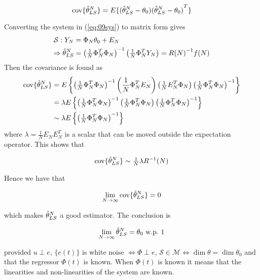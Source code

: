 \begin{equation*}
\text{cov}\{\hat{\theta}_{LS}^N\} = E\{(\hat{\theta}_{LS}^N-\theta_0){(\hat{\theta}_{LS}^N-\theta_0)}^T\}
\end{equation*}

Converting the system in (\ref{eq:09sys}) to matrix form gives
\begin{align*}
\mathcal{S}: Y_N &= \Phi_N\theta_0+E_N \\
\Rightarrow \hat{\theta}_{LS}^N &= {\left(\tfrac{1}{N}\Phi_N^T\Phi_N\right)}^{-1}\left(\tfrac{1}{N}\Phi_N^T Y_N\right) = R{(N)}^{-1}f(N)
\end{align*}
Then the covariance is found as
\begin{align*}
\text{cov}\{\hat{\theta}_{LS}^N\} &= E\left\lbrace{\left(\tfrac{1}{N}\Phi_N^T\Phi_N\right)}^{-1} \left(\frac{1}{N}\Phi_N^T E_N\right)
                        \left(\tfrac{1}{N}E_N^T\Phi_N\right) {\left(\tfrac{1}{N}\Phi_N^T\Phi_N\right)}^{-1}\right\rbrace \\
                   &= \lambda E\left\lbrace{\left(\tfrac{1}{N}\Phi_N^T\Phi_N\right)}^{-1} \left(\tfrac{1}{N}\Phi_N^T\Phi_N\right)
                      {\left(\tfrac{1}{N}\Phi_N^T\Phi_N\right)}^{-1}\right\rbrace \\
                   &\sim \lambda E\left\lbrace{\left(\tfrac{1}{N}\Phi_N^T\Phi_N\right)}^{-1}\right\rbrace
\end{align*}
where $\lambda = \frac{1}{N}E_N E_N^T$ is a scalar that can be moved outside the expectation operator.
This shows that

\begin{equation*}
\text{cov}\{\hat{\theta}_{LS}^N\} \sim \tfrac{1}{N}\lambda R^{-1}(N)
\end{equation*}

Hence we have that

\begin{equation*}
\lim_{N\to\infty}\text{cov}\{\hat{\theta}_{LS}^N\} = 0
\end{equation*}

which makes $\hat{\theta}_{LS}^N$ a good estimator.
The conclusion is

\begin{equation*}
\lim_{N\to\infty}\hat{\theta}_{LS}^N = \theta_0 \text{~w.p.~} 1
\end{equation*}

provided $u\perp e$, $\{e(t)\}$ is white noise $\Leftrightarrow \Phi\perp e$, $\mathcal{S}\in\mathcal{M} \Leftrightarrow \dim\theta = \dim\theta_0$ and that the regressor $\Phi(t)$ is known.
When $\Phi(t)$ is known it means that the linearities and non-linearities of the system are known.

